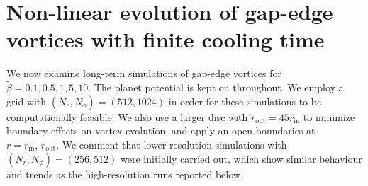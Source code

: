 
\section{Non-linear evolution of
  gap-edge vortices with finite cooling time}\label{nonlinear} 

We now examine long-term simulations of gap-edge vortices for
$\tilde{\beta}=0.1,0.5,1,5,10$. The planet potential is kept on
throughout.  
We employ a grid with $(N_r,N_{\phi})=(512,1024)$ in order for these
simulations to be computationally feasible. We also use a larger
disc with $r_{\mathrm{out}}=45r_{\mathrm{in}}$ to minimize boundary
effects on vortex evolution, and apply an open boundaries at
$r=r_\mathrm{in},\,r_\mathrm{out}$. We comment that lower-resolution
simulations with $(N_r,N_{\phi})=(256,512)$ were initially carried
out, which show similar behaviour and trends as the high-resolution
runs reported below.  




